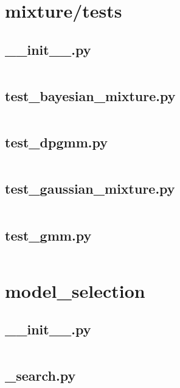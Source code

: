 \documentclass{article}
\begin{document}
\section{mixture/tests}

\subsection{\_\_init\_\_.py}
\inputminted{python}{/home/dufferzafar/dev/@clones/scikit-learn/sklearn/mixture/tests/__init__.py}
\newpage

\subsection{test\_bayesian\_mixture.py}
\inputminted{python}{/home/dufferzafar/dev/@clones/scikit-learn/sklearn/mixture/tests/test_bayesian_mixture.py}
\newpage

\subsection{test\_dpgmm.py}
\inputminted{python}{/home/dufferzafar/dev/@clones/scikit-learn/sklearn/mixture/tests/test_dpgmm.py}
\newpage

\subsection{test\_gaussian\_mixture.py}
\inputminted{python}{/home/dufferzafar/dev/@clones/scikit-learn/sklearn/mixture/tests/test_gaussian_mixture.py}
\newpage

\subsection{test\_gmm.py}
\inputminted{python}{/home/dufferzafar/dev/@clones/scikit-learn/sklearn/mixture/tests/test_gmm.py}
\newpage

\section{model\_selection}

\subsection{\_\_init\_\_.py}
\inputminted{python}{/home/dufferzafar/dev/@clones/scikit-learn/sklearn/model_selection/__init__.py}
\newpage

\subsection{\_search.py}
\inputminted{python}{/home/dufferzafar/dev/@clones/scikit-learn/sklearn/model_selection/_search.py}
\newpage
\end{document}
